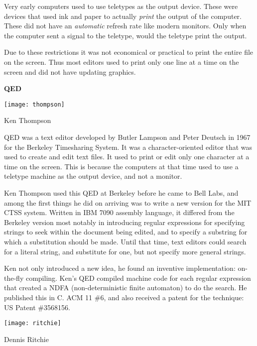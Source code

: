 Very early computers used to use teletypes as the output device.
These were devices that used ink and paper to actually
\textit{print} the output of the computer.
These did not have an \textit{automatic} refresh rate like modern monitors.
Only when the computer sent a signal to the teletype, would the teletype print the output.

Due to these restrictions it was not economical or
practical to print the entire file on the screen.
Thus most editors used to print only one line at a time on the screen
and did not have updating graphics.

\textbf{QED}

\begin{marginfigure}
  \texttt{[image: thompson]}
	\caption{Ken Thompson}
\end{marginfigure}

QED was a text editor developed by Butler Lampson and Peter Deutsch in 1967 for the Berkeley Timesharing System.
It was a character-oriented editor that was used to create and edit text files.
It used to print or edit only one character at a time on the screen.
This is because the computers at that time used to use
a teletype machine as the output device, and not a monitor.

Ken Thompson used this QED at Berkeley before he came to Bell Labs, and among the first things he did on arriving was to write a new version for the MIT CTSS system.
Written in IBM 7090 assembly language, it differed from the Berkeley version most notably in introducing regular expressions
for specifying strings to seek within the document being edited, and to specify a substring for which a substitution should be made.
Until that time, text editors could search for a literal string, and substitute for one, but not specify more general strings.

Ken not only introduced a new idea, he found an inventive implementation: on-the-fly compiling. Ken's QED compiled machine code for each regular expression that created a NDFA (non-deterministic finite automaton) to do the search. He published this in C. ACM 11 \#6, and also received a patent for the technique: US Patent \#3568156.

\begin{marginfigure}
  \texttt{[image: ritchie]}
	\caption{Dennis Ritchie}
\end{marginfigure}

